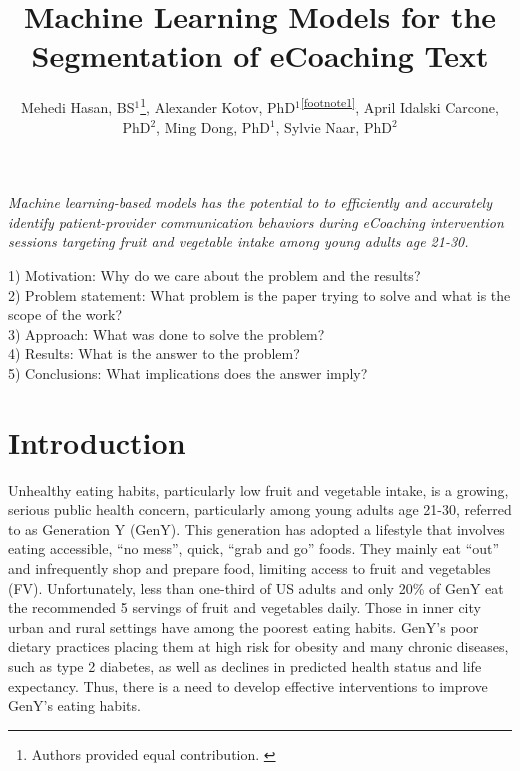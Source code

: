 \documentclass{amia}
\begin{document}
\title{Machine Learning Models for the Segmentation of eCoaching Text}

\author{Mehedi Hasan, BS$^{1}$\footnote[1]{Authors provided equal contribution. \label{footnote1}}, Alexander Kotov, PhD$^{1}$\textsuperscript{\ref{footnote1}}, April Idalski Carcone, PhD$^{2}$, Ming Dong, PhD$^{1}$, Sylvie Naar, PhD$^{2}$}


\maketitle

\textit{Machine learning-based models has the potential to to efficiently and accurately identify patient-provider communication behaviors during eCoaching intervention sessions targeting fruit and vegetable intake among young adults age 21-30. }

1) Motivation: Why do we care about the problem and the results? \\
2) Problem statement: What problem is the paper trying to solve and what is the scope of the work? \\
3) Approach: What was done to solve the problem? \\
4) Results: What is the answer to the problem? \\
5) Conclusions: What implications does the answer imply?

\section*{Introduction}
Unhealthy eating habits, particularly low fruit and vegetable intake, is a growing, serious public health concern, particularly among young adults age 21-30, referred to as Generation Y (GenY)\cite{blanck2008trends,centers2007fruit}. This generation has adopted a lifestyle that involves eating accessible, ``no mess'', quick, ``grab and go'' foods\cite{nebeling2007still,brug1999application}. They mainly eat ``out'' and infrequently shop and prepare food, limiting access to fruit and vegetables (FV)\cite{nelson2009improving,larson2006food}. Unfortunately, less than one-third of US adults\cite{blanck2008trends,ogden2006prevalence} and only 20\% of GenY\cite{blanck2008trends,american2006american,thompson2005dietary} eat the recommended 5 servings of fruit and vegetables daily. Those in inner city urban and rural settings have among the poorest eating habits\cite{blanck2008trends,centers2007fruit,ogden2006prevalence,american2006american,thompson2005dietary}. GenY's poor dietary practices placing them at high risk for obesity and many chronic diseases, such as type 2 diabetes, as well as declines in predicted health status and life expectancy. Thus, there is a need to develop effective interventions to improve GenY's eating habits.
\end{document}
